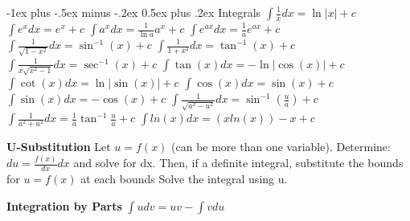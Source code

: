 \documentclass[8pt,landscape]{article}
\makeatletter
\renewcommand{\section}{\@startsection{section}{1}{0mm}%
                                {-1ex plus -.5ex minus -.2ex}%
                                {0.5ex plus .2ex}%
                                {\normalfont\large\bfseries}}
\makeatother
\begin{document}
\begin{multicols*}{5}
\section{Integrals}
$\int \frac{1}{x}dx = \ln|x|+c$\newline
$\int e^x dx = e^x+c $\newline
$\int a^x dx = \frac{1}{\ln a} a^x+c $\newline
$\int e^{ax} dx = \frac{1}{a} e^{ax}+c $\newline
$\int \frac{1}{\sqrt{1-x^2}} dx = \sin^{-1}(x)+c $\newline
$\int \frac{1}{1+x^2} dx = \tan^{-1}(x)+c $\newline
$\int \frac{1}{x\sqrt{x^2-1}} dx = \sec^{-1}(x)+c $\newline
$\int \tan(x) dx = -\ln|\cos(x) |+c $\newline
$\int \cot(x) dx = \ln|\sin(x)|+c $\newline
$\int \cos(x) dx = \sin(x)+c $\newline
$\int \sin(x) dx = -\cos(x)+c $\newline
$\int \frac{1}{\sqrt{a^2-u^2}} dx = \sin^{-1}(\frac{u}{a})+c $\newline
$\int \frac{1}{a^2+u^2} dx = \frac{1}{a}\tan^{-1}\frac{u}{a}+c $\newline
$ \int ln(x) dx = (xln(x))-x+c $\newline

\textbf{U-Substitution}\newline
Let $ u=f(x) $ (can be more than one variable).\newline
Determine: $ du = \frac{f(x)}{dx}dx $ and solve for dx.\newline
Then, if a definite integral, substitute the bounds for $ u=f(x) $ at each bounds\newline
Solve the integral using u.\newline

\textbf{Integration by Parts}\newline
$ \int u dv = uv-\int v du $


\end{multicols*}
\end{document}

